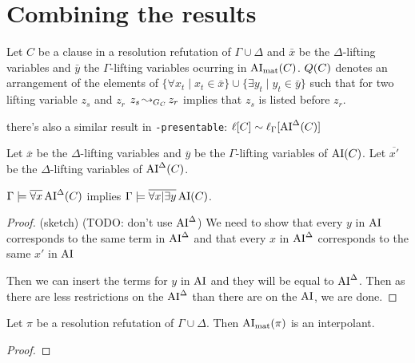 \documentclass[,%
	draft=false,%
	numbers=noendperiod
	11pt,
	a4paper,
	oneside,%
	openany,
]{memoir}
\begin{document}
\section{Combining the results}

\begin{defi}
	Let $C$ be a clause in a resolution refutation of $\Gamma\cup\Delta$
	and $\bar x$ be the $\Delta$-lifting variables and $\bar y$ the $\Gamma$-lifting variables ocurring in $\operatorname{AI}_\mathrm{mat}(C)$.
	$Q(C)$ denotes an arrangement of the elements of  $\{ \forall x_t \mid x_t \in \bar x\} \cup \{ \exists y_t \mid y_t \in \bar y\}$ such that for two lifting variable $z_s$ and $z_r$ $z_s \operatorname{\leadsto}_{G_C} z_r$ implies that $z_s$ is listed before $z_r$.
\end{defi}


there's also a similar result in \texttt{-presentable}: $\ell[C] \sim \ell_{\Gamma}[ \operatorname{AI}^\Delta(C) ] $

\begin{lemma}
	Let $\overline x$ be the $\Delta$-lifting variables and $\overline y$ be the $\Gamma$-lifting variables of $\operatorname{AI}(C)$.
	Let $\overline {x'}$ be the $\Delta$-lifting variables of $\operatorname{AI}^\Delta(C)$.

	$\Gamma \models \overline{\forall x} \operatorname{AI}^\Delta(C)$ implies
	$\Gamma \models \overline{\forall x | \exists y} \operatorname{AI}(C)$.
\end{lemma}
\begin{proof}
	\cbstart
	(sketch) (TODO: don't use $\operatorname{AI}^\Delta$)
	We need to show that every $y$ in $\operatorname{AI}$ corresponds to the same term in $\operatorname{AI}^\Delta$ and that every $x$ in $\operatorname{AI}^\Delta$ corresponds to the same $x'$ in $\operatorname{AI}$

	Then we can insert the terms for $y$ in $\operatorname{AI}$ and they will be equal to $\operatorname{AI}^\Delta$. Then as there are less restrictions on the $\operatorname{AI}^\Delta$ than there are on the $\operatorname{AI}$, we are done.
	\cbend
\end{proof}


\begin{thm}
	Let $\pi$ be a resolution refutation of $\Gamma\cup\Delta$.
	Then $\operatorname{AI}_\mathrm{mat}( \pi )$ is an interpolant.
\end{thm}
\begin{proof}

\end{proof}
\end{document}
